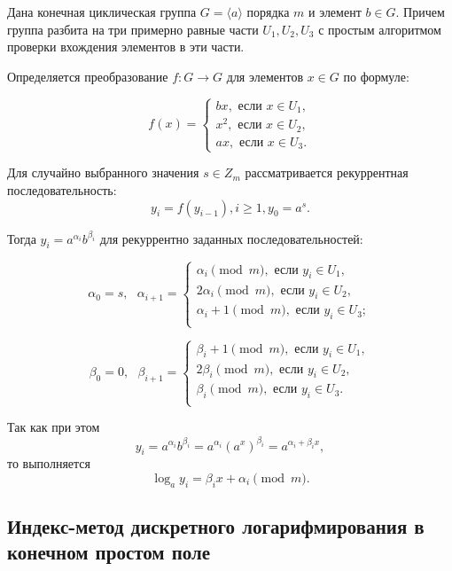 \documentclass[bachelor, och, labwork]{shiza}
\begin{document}
        Дана конечная циклическая группа $G = \langle a \rangle$ порядка $m$ и
        элемент $b \in G$. Причем группа разбита на три примерно равные части
        $U_1, U_2, U_3$ с простым алгоритмом проверки вхождения элементов в эти
        части.

        Определяется преобразование $f: G \to G$ для элементов $x \in G$ по
        формуле:

        \[f(x) =
            \begin{cases}
                bx, \text{ если } x \in U_1,\\
                x^2, \text{ если } x \in U_2,\\
                ax, \text{ если } x \in U_3.
            \end{cases}
        \]

        Для случайно выбранного значения $s \in Z_m$ рассматривается
        рекуррентная последовательность: $$y_i = f(y_{i - 1}), i \geq 1, y_0 =
        a^s.$$

        Тогда $y_i = a^{\alpha_i} b^{\beta_i}$ для рекуррентно заданных
        последовательностей:

        \[\alpha_0 = s, \text{ } \alpha_{i + 1} = \begin{cases}
            \alpha_i \pmod m, \text{ если } y_i \in U_1,\\    
            2\alpha_i \pmod m, \text{ если } y_i \in U_2,\\    
            \alpha_i + 1 \pmod m, \text{ если } y_i \in U_3;\\    
        \end{cases}
        \]

        \[\beta_0 = 0, \text{ } \beta_{i + 1} = \begin{cases}
            \beta_i + 1 \pmod m, \text{ если } y_i \in U_1,\\    
            2\beta_i \pmod m, \text{ если } y_i \in U_2,\\    
            \beta_i \pmod m, \text{ если } y_i \in U_3.\\    
        \end{cases}
        \]

        Так как при этом $$y_i = a^{\alpha_i} b^{\beta_i} = a^{\alpha_i}
        (a^x)^{\beta_i} = a^{\alpha_i + \beta_i x},$$
        то выполняется $$\log_a y_i = \beta_i x + \alpha_i \pmod m.$$

    \subsection{Индекс-метод дискретного логарифмирования в конечном простом поле}
\end{document}
